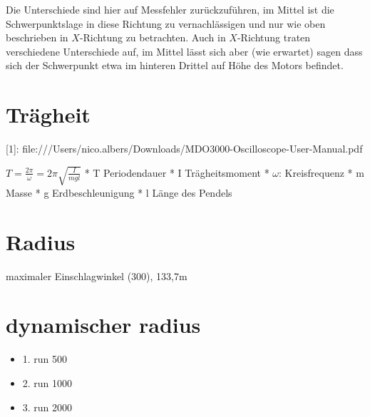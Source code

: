 \documentclass[11pt]{article}
\begin{document}
    Die Unterschiede sind hier auf Messfehler zurückzuführen, im Mittel ist die Schwerpunktslage in diese Richtung zu vernachlässigen und nur wie oben beschrieben in $X$-Richtung zu betrachten.
    Auch in $X$-Richtung traten verschiedene Unterschiede auf, im Mittel lässt sich aber (wie erwartet) sagen dass sich der Schwerpunkt etwa im hinteren Drittel auf Höhe des Motors befindet.

\section{Trägheit}
[1]: file:///Users/nico.albers/Downloads/MDO3000-Oscilloscope-User-Manual.pdf


$T=\frac{2\pi}{\omega} = 2\pi\sqrt{\frac{I}{mgl}}$
* T Periodendauer
* I Trägheitsmoment
* $\omega$: Kreisfrequenz
* m Masse
* g Erdbeschleunigung
* l Länge des Pendels



\section{Radius}
maximaler Einschlagwinkel (300), 133,7m


\section{dynamischer radius}
\begin{itemize}
    \item 1. run 500
    \item 2. run 1000
    \item 3. run 2000
\end{itemize}
\end{document}
